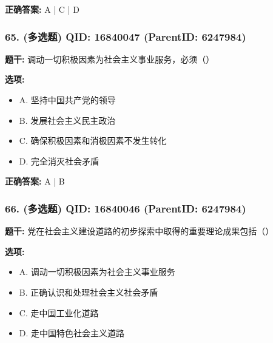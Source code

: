 \documentclass[12pt,UTF8]{ctexart}
\begin{document}
\textbf{正确答案:}
A | C | D

\vspace{0.3em}\hrulefill\vspace{0.7em}

\subsubsection*{65. (多选题) \small QID: 16840047 (ParentID: 6247984)}

\textbf{题干:}
调动一切积极因素为社会主义事业服务，必须（）



\textbf{选项:}
\begin{itemize}[leftmargin=*]

  \item A. 坚持中国共产党的领导

  \item B. 发展社会主义民主政治

  \item C. 确保积极因素和消极因素不发生转化

  \item D. 完全消灭社会矛盾

\end{itemize}

\textbf{正确答案:}
A | B

\vspace{0.3em}\hrulefill\vspace{0.7em}

\subsubsection*{66. (多选题) \small QID: 16840046 (ParentID: 6247984)}

\textbf{题干:}
党在社会主义建设道路的初步探索中取得的重要理论成果包括（）



\textbf{选项:}
\begin{itemize}[leftmargin=*]

  \item A. 调动一切积极因素为社会主义事业服务

  \item B. 正确认识和处理社会主义社会矛盾

  \item C. 走中国工业化道路

  \item D. 走中国特色社会主义道路

\end{itemize}
\end{document}
